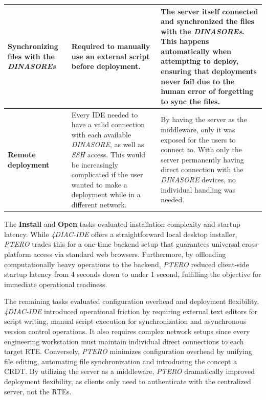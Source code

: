 \begin{longtable}{p{2.5cm}p{6cm}p{5.5cm}}
\textbf{Synchronizing files with the \textit{DINASOREs}} &
Required to manually use an external script before deployment. &
The server itself connected and synchronized the files with the \textit{DINASOREs}. This happens automatically when attempting to deploy, ensuring that deployments never fail due to the human error of forgetting to sync the files. \\ \hline

\textbf{Remote deployment} &
Every \ac{IDE} needed to have a valid connection with each available \textit{DINASORE}, as well as \textit{SSH} access. This would be increasingly complicated if the user wanted to make a deployment while in a different network. &
By having the server as the middleware, only it was exposed for the users to connect to. With only the server permanently having direct connection with the \textit{DINASORE} devices, no individual handling was needed. \\ \hline

\end{longtable}

The \textbf{Install} and \textbf{Open} tasks evaluated installation complexity and startup latency. While \textit{4DIAC-IDE} offers a straightforward local desktop installer, \textit{PTERO} trades this for a one-time backend setup that guarantees universal cross-platform access via standard web browsers. Furthermore, by offloading computationally heavy operations to the backend, \textit{PTERO} reduced client-side startup latency from 4 seconds down to under 1 second, fulfilling the objective for immediate operational readiness.

The remaining tasks evaluated configuration overhead and deployment flexibility. \textit{4DIAC-IDE} introduced operational friction by requiring external text editors for script writing, manual script execution for synchronization and asynchronous version control operations. It also requires complex network setups since every engineering workstation must maintain individual direct connections to each target \ac{RTE}. Conversely, \textit{PTERO} minimizes configuration overhead by unifying file editing, automating file synchronization and introducing the concept a \ac{CRDT}. By utilizing the server as a middleware, \textit{PTERO} dramatically improved deployment flexibility, as clients only need to authenticate with the centralized server, not the \acp{RTE}.

